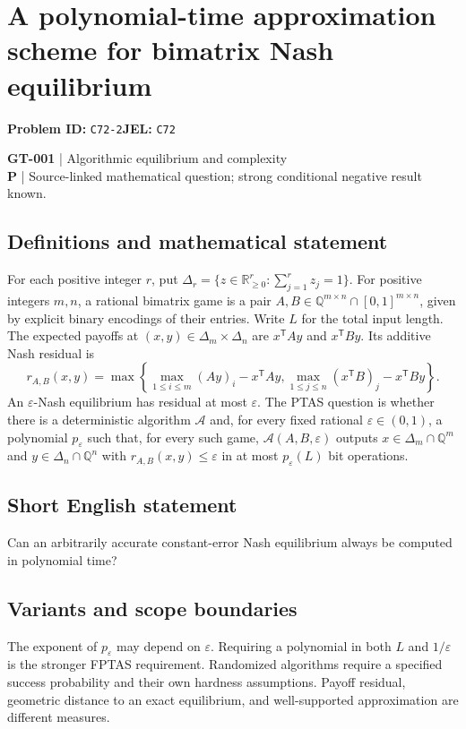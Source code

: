 \documentclass[11pt,a4paper]{article}
\begin{document}
\section*{A polynomial-time approximation scheme for bimatrix Nash equilibrium}
\textbf{Problem ID:} \texttt{C72-2}\quad \textbf{JEL:} \texttt{C72}\par
\label{problem:OP-0131}
\label{game:GT-001}
{\sffamily\small\color{muted}
\textbf{GT-001} | Algorithmic equilibrium and complexity\\
\textbf{P} | Source-linked mathematical question; strong conditional negative result known.
\par}
\subsection*{Definitions and mathematical statement}
For each positive integer $r$, put $\Delta_r=\{z\in\mathbb R_{\geq0}^{r}:\sum_{j=1}^{r}z_j=1\}$. For positive integers $m,n$, a rational bimatrix game is a pair $A,B\in\mathbb Q^{m\times n}\cap[0,1]^{m\times n}$, given by explicit binary encodings of their entries. Write $L$ for the total input length. The expected payoffs at $(x,y)\in\Delta_m\times\Delta_n$ are $x^{\mathsf T}Ay$ and $x^{\mathsf T}By$. Its additive Nash residual is
\[
 r_{A,B}(x,y)=\max\left\{\max_{1\leq i\leq m}(Ay)_i-x^{\mathsf T}Ay,
 \max_{1\leq j\leq n}(x^{\mathsf T}B)_j-x^{\mathsf T}By\right\}.
\]
An $\varepsilon$-Nash equilibrium has residual at most $\varepsilon$. The PTAS question is whether there is a deterministic algorithm $\mathcal A$ and, for every fixed rational $\varepsilon\in(0,1)$, a polynomial $p_\varepsilon$ such that, for every such game, $\mathcal A(A,B,\varepsilon)$ outputs $x\in\Delta_m\cap\mathbb Q^m$ and $y\in\Delta_n\cap\mathbb Q^n$ with $r_{A,B}(x,y)\leq\varepsilon$ in at most $p_\varepsilon(L)$ bit operations.
\subsection*{Short English statement}
Can an arbitrarily accurate constant-error Nash equilibrium always be computed in polynomial time?
\subsection*{Variants and scope boundaries}
The exponent of $p_\varepsilon$ may depend on $\varepsilon$. Requiring a polynomial in both $L$ and $1/\varepsilon$ is the stronger FPTAS requirement. Randomized algorithms require a specified success probability and their own hardness assumptions. Payoff residual, geometric distance to an exact equilibrium, and well-supported approximation are different measures.
\end{document}
